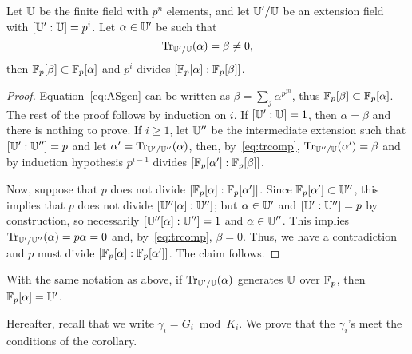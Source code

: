 \begin{lemma}
  Let $\mathbb{U}$ be the finite field with $p^n$ elements, and let $\mathbb{U}'/\mathbb{U}$
  be an extension field with $[\mathbb{U}':\mathbb{U}]=p^i$. Let $\alpha\in\mathbb{U}'$ be
  such that
  \begin{equation}
    \label{eq:ASgen}
    \operatorname{Tr}_{\mathbb{U}'/\mathbb{U}}(\alpha) = \beta \ne 0
    \text{,}
  \end{equation}
  then $\mathbb{F}_p[\beta]\subset\mathbb{F}_p[\alpha]$ and $p^i$ divides
  $\left[\mathbb{F}_p[\alpha]:\mathbb{F}_p[\beta]\right]$.
\end{lemma}
\begin{proof} Equation~\eqref{eq:ASgen} can be written as $\beta = \sum_j
\alpha^{p^{jn}}$, thus $\mathbb{F}_p[\beta] \subset \mathbb{F}_p[\alpha]$.  The rest
of the proof follows by induction on $i$. If $[\mathbb{U}':\mathbb{U}]=1$, then
$\alpha=\beta$ and there is nothing to prove. If $i\ge1$, let $\mathbb{U}''$
be the intermediate extension such that $[\mathbb{U}':\mathbb{U}'']=p$ and let
$\alpha'=\operatorname{Tr}_{\mathbb{U}'/\mathbb{U}''}(\alpha)$, then, by~\ref{eq:trcomp},
$\operatorname{Tr}_{\mathbb{U}''/\mathbb{U}}(\alpha') = \beta$ and by induction hypothesis $p^{i-1}$
divides $[\mathbb{F}_p[\alpha']:\mathbb{F}_p[\beta]]$.

Now, suppose that $p$ does not divide $[\mathbb{F}_p[\alpha]:\mathbb{F}_p[\alpha']]$.
Since $\mathbb{F}_p[\alpha']\subset\mathbb{U}''$, this implies that $p$ does not
divide $[\mathbb{U}''[\alpha]:\mathbb{U}'']$; but $\alpha\in\mathbb{U}'$ and $[\mathbb{U}':\mathbb{U}'']=p$ by
construction, so necessarily $[\mathbb{U}''[\alpha]:\mathbb{U}''] = 1$ and
$\alpha\in\mathbb{U}''$. This implies $\operatorname{Tr}_{\mathbb{U}'/\mathbb{U}''}(\alpha) = p\alpha = 0$
and, by~\ref{eq:trcomp}, $\beta=0$. Thus, we have a contradiction and
$p$ must divide $[\mathbb{F}_p[\alpha]:\mathbb{F}_p[\alpha']]$. The claim
follows.\end{proof}

\begin{corollary}
  \label{coro:gen}
  With the same notation as above, if $\operatorname{Tr}_{\mathbb{U}'/\mathbb{U}}(\alpha)$ generates
  $\mathbb{U}$ over $\mathbb{F}_p$, then $\mathbb{F}_p[\alpha] = \mathbb{U}'$.
\end{corollary}

Hereafter, recall that we write $\gamma_i=G_i \bmod K_i$. We prove
that the $\gamma_i$'s meet the conditions of the corollary.

